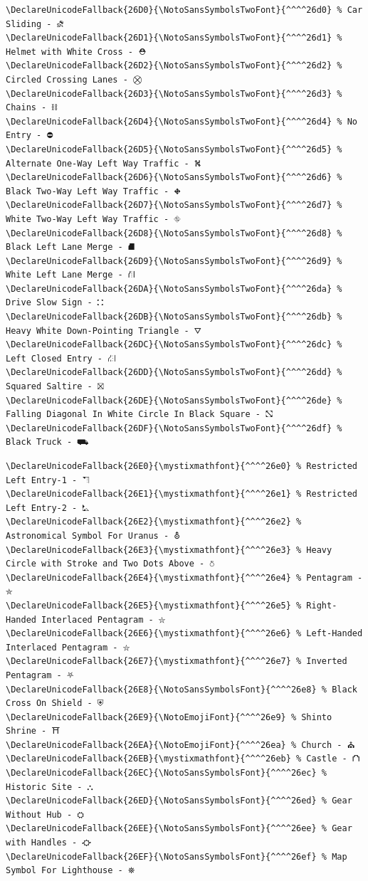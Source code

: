 \documentclass[12pt, twoside]{article}
\begin{document}
\newpage
\begin{verbatim}
\DeclareUnicodeFallback{26D0}{\NotoSansSymbolsTwoFont}{^^^^26d0} % Car Sliding - ⛐
\DeclareUnicodeFallback{26D1}{\NotoSansSymbolsTwoFont}{^^^^26d1} % Helmet with White Cross - ⛑
\DeclareUnicodeFallback{26D2}{\NotoSansSymbolsTwoFont}{^^^^26d2} % Circled Crossing Lanes - ⛒
\DeclareUnicodeFallback{26D3}{\NotoSansSymbolsTwoFont}{^^^^26d3} % Chains - ⛓
\DeclareUnicodeFallback{26D4}{\NotoSansSymbolsTwoFont}{^^^^26d4} % No Entry - ⛔
\DeclareUnicodeFallback{26D5}{\NotoSansSymbolsTwoFont}{^^^^26d5} % Alternate One-Way Left Way Traffic - ⛕
\DeclareUnicodeFallback{26D6}{\NotoSansSymbolsTwoFont}{^^^^26d6} % Black Two-Way Left Way Traffic - ⛖
\DeclareUnicodeFallback{26D7}{\NotoSansSymbolsTwoFont}{^^^^26d7} % White Two-Way Left Way Traffic - ⛗
\DeclareUnicodeFallback{26D8}{\NotoSansSymbolsTwoFont}{^^^^26d8} % Black Left Lane Merge - ⛘
\DeclareUnicodeFallback{26D9}{\NotoSansSymbolsTwoFont}{^^^^26d9} % White Left Lane Merge - ⛙
\DeclareUnicodeFallback{26DA}{\NotoSansSymbolsTwoFont}{^^^^26da} % Drive Slow Sign - ⛚
\DeclareUnicodeFallback{26DB}{\NotoSansSymbolsTwoFont}{^^^^26db} % Heavy White Down-Pointing Triangle - ⛛
\DeclareUnicodeFallback{26DC}{\NotoSansSymbolsTwoFont}{^^^^26dc} % Left Closed Entry - ⛜
\DeclareUnicodeFallback{26DD}{\NotoSansSymbolsTwoFont}{^^^^26dd} % Squared Saltire - ⛝
\DeclareUnicodeFallback{26DE}{\NotoSansSymbolsTwoFont}{^^^^26de} % Falling Diagonal In White Circle In Black Square - ⛞
\DeclareUnicodeFallback{26DF}{\NotoSansSymbolsTwoFont}{^^^^26df} % Black Truck - ⛟

\end{verbatim}
\newpage
\begin{verbatim}
\DeclareUnicodeFallback{26E0}{\mystixmathfont}{^^^^26e0} % Restricted Left Entry-1 - ⛠
\DeclareUnicodeFallback{26E1}{\mystixmathfont}{^^^^26e1} % Restricted Left Entry-2 - ⛡
\DeclareUnicodeFallback{26E2}{\mystixmathfont}{^^^^26e2} % Astronomical Symbol For Uranus - ⛢
\DeclareUnicodeFallback{26E3}{\mystixmathfont}{^^^^26e3} % Heavy Circle with Stroke and Two Dots Above - ⛣
\DeclareUnicodeFallback{26E4}{\mystixmathfont}{^^^^26e4} % Pentagram - ⛤
\DeclareUnicodeFallback{26E5}{\mystixmathfont}{^^^^26e5} % Right-Handed Interlaced Pentagram - ⛥
\DeclareUnicodeFallback{26E6}{\mystixmathfont}{^^^^26e6} % Left-Handed Interlaced Pentagram - ⛦
\DeclareUnicodeFallback{26E7}{\mystixmathfont}{^^^^26e7} % Inverted Pentagram - ⛧
\DeclareUnicodeFallback{26E8}{\NotoSansSymbolsFont}{^^^^26e8} % Black Cross On Shield - ⛨
\DeclareUnicodeFallback{26E9}{\NotoEmojiFont}{^^^^26e9} % Shinto Shrine - ⛩
\DeclareUnicodeFallback{26EA}{\NotoEmojiFont}{^^^^26ea} % Church - ⛪
\DeclareUnicodeFallback{26EB}{\mystixmathfont}{^^^^26eb} % Castle - ⛫
\DeclareUnicodeFallback{26EC}{\NotoSansSymbolsFont}{^^^^26ec} % Historic Site - ⛬
\DeclareUnicodeFallback{26ED}{\NotoSansSymbolsFont}{^^^^26ed} % Gear Without Hub - ⛭
\DeclareUnicodeFallback{26EE}{\NotoSansSymbolsFont}{^^^^26ee} % Gear with Handles - ⛮
\DeclareUnicodeFallback{26EF}{\NotoSansSymbolsFont}{^^^^26ef} % Map Symbol For Lighthouse - ⛯

\end{verbatim}
\end{document}
